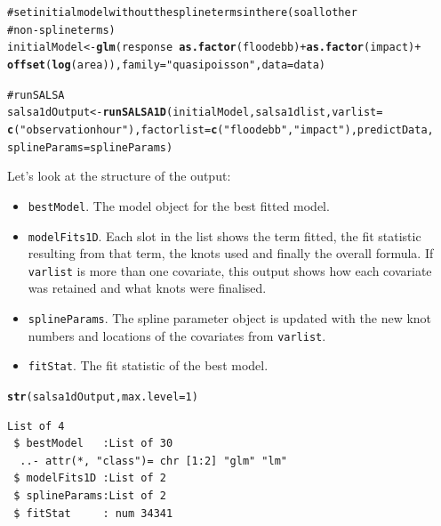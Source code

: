 \documentclass[11pt, a4paper]{article}
\makeatletter
\newcommand{\hlfunctioncall}[1]{\textcolor[rgb]{0.501960784313725,0,0.329411764705882}{\textbf{#1}}}%
\newcommand{\hlstring}[1]{\textcolor[rgb]{0.6,0.6,1}{#1}}%
\newcommand{\hlcomment}[1]{\textcolor[rgb]{0.180392156862745,0.6,0.341176470588235}{#1}}%
\newenvironment{kframe}{%
 \def\at@end@of@kframe{}%
 \ifinner\ifhmode%
  \def\at@end@of@kframe{\end{minipage}}%
  \begin{minipage}{\columnwidth}%
 \fi\fi%
 \def\FrameCommand##1{\hskip\@totalleftmargin \hskip-\fboxsep
 \colorbox{shadecolor}{##1}\hskip-\fboxsep
     \hskip-\linewidth \hskip-\@totalleftmargin \hskip\columnwidth}%
 \MakeFramed {\advance\hsize-\width
   \@totalleftmargin\z@ \linewidth\hsize
   \@setminipage}}%
 {\par\unskip\endMakeFramed%
 \at@end@of@kframe}
\newenvironment{knitrout}{}{} %
\makeatother
\begin{document}
\begin{frame}[fragile]
\begin{knitrout}
\begin{kframe}
\begin{alltt}
\hlcomment{# set initial model without the spline terms in there (so all other }
\hlcomment{# non-spline terms)}
initialModel <- \hlfunctioncall{glm}(response ~ \hlfunctioncall{as.factor}(floodebb) + \hlfunctioncall{as.factor}(impact) + 
    \hlfunctioncall{offset}(\hlfunctioncall{log}(area)), family = \hlstring{"quasipoisson"}, data = data)

\end{alltt}
\end{kframe}
\end{knitrout}

\begin{knitrout}\footnotesize
{}\color{fgcolor}\begin{kframe}
\begin{alltt}
\hlcomment{# run SALSA}
salsa1dOutput <- \hlfunctioncall{runSALSA1D}(initialModel, salsa1dlist, varlist=
    \hlfunctioncall{c}(\hlstring{"observationhour"}), factorlist=\hlfunctioncall{c}(\hlstring{"floodebb"}, \hlstring{"impact"}), predictData, 
    splineParams=splineParams)
\end{alltt}
\end{kframe}
\end{knitrout}

\end{frame}

\begin{frame}[fragile]
\noindent Let's look at the structure of the output: 
\begin{itemize}
\item {\tt bestModel}. The model object for the best fitted model.
\item {\tt modelFits1D}.  Each slot in the list shows the term fitted, the fit statistic resulting from that term, the knots used and finally the overall formula.  If {\tt varlist} is more than one covariate, this output shows how each covariate was retained and what knots were finalised.
\item {\tt splineParams}.  The spline parameter object is updated with the new knot numbers and locations of the covariates from {\tt varlist}.
\item {\tt fitStat}.  The fit statistic of the best model.
\end{itemize}

\begin{knitrout}\footnotesize
{}\color{fgcolor}\begin{kframe}
\begin{alltt}
\hlfunctioncall{str}(salsa1dOutput, max.level = 1)
\end{alltt}
\begin{verbatim}
List of 4
 $ bestModel   :List of 30
  ..- attr(*, "class")= chr [1:2] "glm" "lm"
 $ modelFits1D :List of 2
 $ splineParams:List of 2
 $ fitStat     : num 34341
\end{verbatim}
\end{kframe}
\end{knitrout}
\end{frame}
\end{document}
